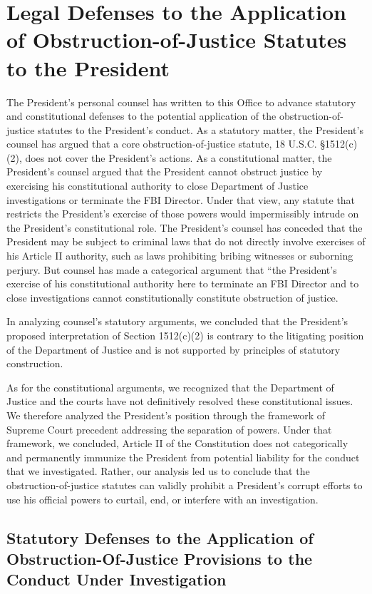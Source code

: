 \section{Legal Defenses to the Application of Obstruction-of-Justice Statutes to the President}

The President’s personal counsel has written to this Office to advance statutory and constitutional defenses to the potential application of the obstruction-of-justice statutes to the President’s conduct.%
As a statutory matter, the President’s counsel has argued that a core obstruction-of-justice statute, 18 U.S.C. \S 1512(c)(2), does not cover the President’s actions.%
As a constitutional matter, the President’s counsel argued that the President cannot obstruct justice by exercising his constitutional authority to close Department of Justice investigations or terminate the FBI Director.%
Under that view, any statute that restricts the President’s exercise of those powers would impermissibly intrude on the President’s constitutional role.
The President’s counsel has conceded that the President may be subject to criminal laws that do not directly involve exercises of his Article II authority, such as laws prohibiting bribing witnesses or suborning perjury.%
But counsel has made a categorical argument that “the President’s exercise of his constitutional authority here to terminate an FBI Director and to close investigations cannot constitutionally constitute obstruction of justice.%

In analyzing counsel’s statutory arguments, we concluded that the President’s proposed interpretation of Section 1512(c)(2) is contrary to the litigating position of the Department of Justice and is not supported by principles of statutory construction.

As for the constitutional arguments, we recognized that the Department of Justice and the courts have not definitively resolved these constitutional issues.
We therefore analyzed the President’s position through the framework of Supreme Court precedent addressing the separation of powers.
Under that framework, we concluded, Article II of the Constitution does not categorically and permanently immunize the President from potential liability for the conduct that we investigated.
Rather, our analysis led us to conclude that the obstruction-of-justice statutes can validly prohibit a President’s corrupt efforts to use his official powers to curtail, end, or interfere with an investigation.

\subsection{Statutory Defenses to the Application of Obstruction-Of-Justice Provisions to the Conduct Under Investigation}

